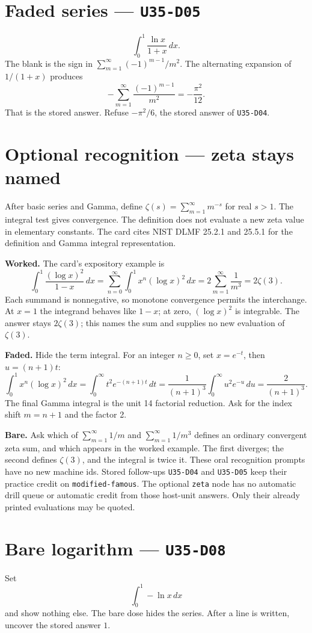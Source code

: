 \section{Faded series --- \texttt{U35-D05}}
\[
\int_0^1\frac{\ln x}{1+x}\,dx.
\]
The blank is the sign in $\sum_{m=1}^{\infty}(-1)^{m-1}/m^2$. The alternating expansion of $1/(1+x)$ produces
\[
-\sum_{m=1}^{\infty}\frac{(-1)^{m-1}}{m^2}=-\frac{\pi^2}{12}.
\]
That is the stored answer. Refuse $-\pi^2/6$, the stored answer of \texttt{U35-D04}.

\section{Optional recognition --- zeta stays named}
After basic series and Gamma, define $\zeta(s)=\sum_{m=1}^{\infty}m^{-s}$ for real $s>1$. The integral test gives convergence. The definition does not evaluate a new zeta value in elementary constants. The card cites NIST DLMF 25.2.1 and 25.5.1 for the definition and Gamma integral representation.

\textbf{Worked.} The card's expository example is
\[
\int_0^1\frac{(\log x)^2}{1-x}\,dx
=\sum_{n=0}^{\infty}\int_0^1 x^n(\log x)^2\,dx
=2\sum_{m=1}^{\infty}\frac1{m^3}=2\zeta(3).
\]
Each summand is nonnegative, so monotone convergence permits the interchange. At $x=1$ the integrand behaves like $1-x$; at zero, $(\log x)^2$ is integrable. The answer stays $2\zeta(3)$; this names the sum and supplies no new evaluation of $\zeta(3)$.

\textbf{Faded.} Hide the term integral. For an integer $n\geq0$, set $x=e^{-t}$, then $u=(n+1)t$:
\[
\int_0^1x^n(\log x)^2\,dx
=\int_0^{\infty}t^2e^{-(n+1)t}\,dt
=\frac{1}{(n+1)^3}\int_0^{\infty}u^2e^{-u}\,du
=\frac{2}{(n+1)^3}.
\]
The final Gamma integral is the unit 14 factorial reduction. Ask for the index shift $m=n+1$ and the factor 2.

\textbf{Bare.} Ask which of $\sum_{m=1}^{\infty}1/m$ and $\sum_{m=1}^{\infty}1/m^3$ defines an ordinary convergent zeta sum, and which appears in the worked example. The first diverges; the second defines $\zeta(3)$, and the integral is twice it. These oral recognition prompts have no new machine ids. Stored follow-ups \texttt{U35-D04} and \texttt{U35-D05} keep their practice credit on \texttt{modified-famous}. The optional \texttt{zeta} node has no automatic drill queue or automatic credit from those host-unit answers. Only their already printed evaluations may be quoted.

\section{Bare logarithm --- \texttt{U35-D08}}
Set
\[
\int_0^1 -\ln x\,dx
\]
and show nothing else. The bare dose hides the series. After a line is written, uncover the stored answer $1$.

